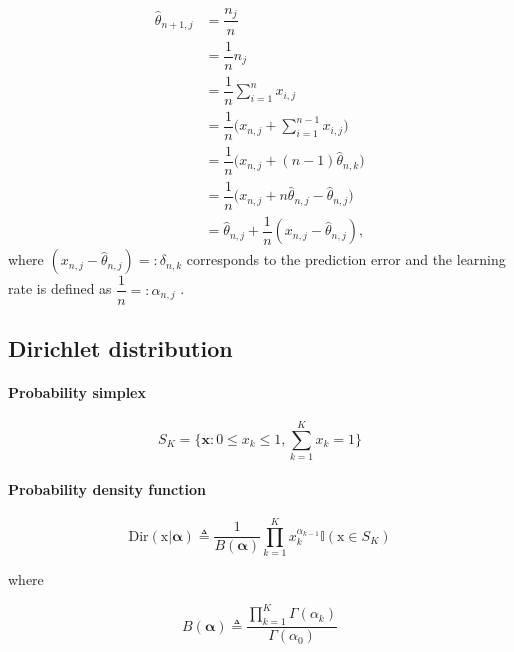 \documentclass[a4paper,12pt]{article}
\begin{document}
\begin{equation}
\begin{aligned}
\hat{\theta}_{n+1,j} &= \dfrac{n_{j}}{n} \\ 
&= \dfrac{1}{n}n_{j} \\ 
&= \dfrac{1}{n}\sum_{i=1}^{n}x_{i,j} \\
&= \dfrac{1}{n}\Big(x_{n,j} + \sum_{i=1}^{n-1}x_{i,j}  \Big) \\
&= \dfrac{1}{n}\Big(x_{n,j} + (n-1)\hat{\theta}_{n,k} \Big) \\
&= \dfrac{1}{n}\big(x_{n,j}+n\hat{\theta}_{n,j}-\hat{\theta}_{n,j}\big) \\
&= \hat{\theta}_{n,j} + \dfrac{1}{n}(x_{n,j} - \hat{\theta}_{n,j}),
\end{aligned}
\label{eq:model}
\end{equation}
where $(x_{n,j}-\hat{\theta}_{n,j}) =: \delta_{n,k}$ corresponds to the prediction error and the learning rate is defined as $\dfrac{1}{n}=:\alpha_{n,j}$ \citep{Sutton1998}.

\subsection*{Dirichlet distribution}

\paragraph*{Probability simplex}

\begin{equation}
S_K = \{\mathbf{x} : 0\le x_k \le 1, \sum^K_{k=1}x_k=1\}
\end{equation}

\paragraph*{Probability density function}

\begin{equation}
\mathrm{Dir}(\boldsymbol{\mathrm{x}}|\boldsymbol{\alpha}) \triangleq \dfrac{1}{B(\mathbf{\boldsymbol\alpha})} \prod^K_{k=1}x_k^{\alpha_{k-1}}\mathbb{I}(\boldsymbol{\mathrm{x}}\in S_K)	
\end{equation}

where

\begin{equation}
B(\boldsymbol{\alpha}) \triangleq \dfrac{\prod_{k=1}^K \Gamma(\alpha_k)}{\Gamma(\alpha_0)} 	
\end{equation}
\end{document}
